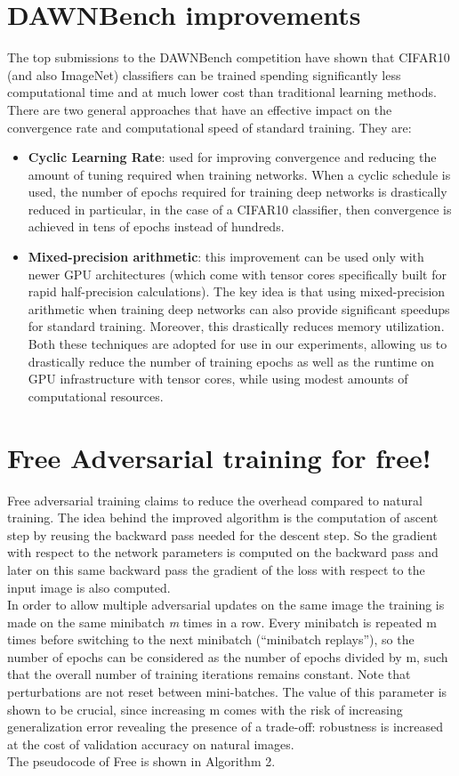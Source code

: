 \documentclass{article}
\begin{document}
\section{DAWNBench improvements}
The top submissions to the DAWNBench competition have shown that CIFAR10 (and also ImageNet) classifiers can be trained spending significantly less computational time and at much lower cost than traditional learning methods. There are two general approaches that have an effective impact on the convergence rate and computational speed of standard training. They are:
\begin{itemize}

\item \textbf{Cyclic Learning Rate}: used for improving convergence and reducing the amount of tuning required when training networks. When a cyclic schedule is used, the number of epochs required for training deep networks is drastically reduced in particular, in the case of a CIFAR10 classifier, then convergence is achieved in tens of epochs instead of hundreds.
\item \textbf{Mixed-precision arithmetic}: this improvement can be used only with newer GPU architectures (which come with tensor cores specifically built for rapid half-precision calculations). The key idea is that using mixed-precision arithmetic when training deep networks can also provide significant speedups for standard training. Moreover, this drastically reduces memory utilization.
Both these techniques are adopted for use in our experiments, allowing us to drastically reduce the number of training epochs as well as the runtime on GPU  infrastructure with tensor cores, while using modest amounts of computational resources. 
\end{itemize}
\section{Free Adversarial training for free!}

Free adversarial training \cite{ShafahiEtAl2019b} claims to reduce the overhead compared to natural training. The idea behind the improved algorithm is the computation of ascent step by reusing the backward pass needed for the descent step. So the gradient with respect to the network parameters is computed on the backward pass and later on this same backward pass the gradient of the loss with respect to the input image is also computed.\\
In order to allow multiple adversarial updates on the same image the training is made on the same minibatch \textit{m} times in a row. Every minibatch is repeated m times before switching to the next minibatch (“minibatch replays”), so the number of epochs can be considered as the number of epochs divided by m, such that the overall number of training iterations remains constant. Note that perturbations are not reset between mini-batches. The value of this parameter is shown to be crucial, since increasing m comes with the risk of increasing generalization error revealing  the presence of a trade-off: robustness is increased at the cost of validation accuracy on natural images.\\
The pseudocode of Free is shown in Algorithm 2.
\end{document}
